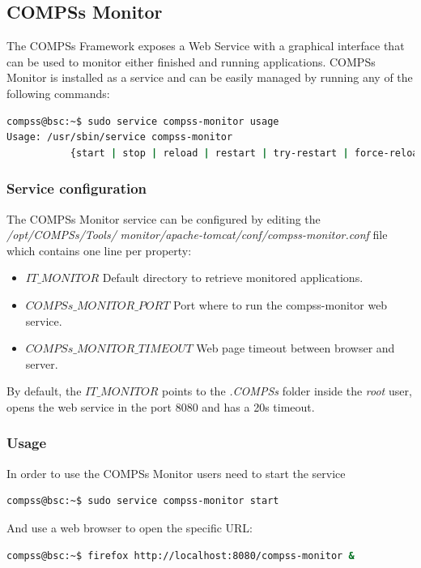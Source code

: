 \subsection{COMPSs Monitor}
\label{subsec:monitor}
The COMPSs Framework exposes a Web Service with a graphical interface that can be used to monitor either finished 
and running applications. COMPSs Monitor is installed as a service and can be easily managed by running any of the following
commands:
\begin{lstlisting}[language=bash]
compss@bsc:~$ sudo service compss-monitor usage
Usage: /usr/sbin/service compss-monitor 
           {start | stop | reload | restart | try-restart | force-reload | status}
\end{lstlisting}

\subsubsection{Service configuration}
The COMPSs Monitor service can be configured by editing the \textit{/opt/COMPSs/Tools/}
\textit{monitor/apache-tomcat/conf/compss-monitor.conf}
file which contains one line per property:
\begin{itemize}
 \item \textbf{$IT\_MONITOR$} Default directory to retrieve monitored applications.
 \item \textbf{$COMPSs\_MONITOR\_PORT$} Port where to run the compss-monitor web service.
 \item \textbf{$COMPSs\_MONITOR\_TIMEOUT$} Web page timeout between browser and server.
\end{itemize}

By default, the $IT\_MONITOR$ points to the \textit{.COMPSs} folder inside the \textit{root} user, opens the web service in the 
port 8080 and has a 20s timeout. 

\subsubsection{Usage}
In order to use the COMPSs Monitor users need to start the service 
\begin{lstlisting}[language=bash]
compss@bsc:~$ sudo service compss-monitor start
\end{lstlisting}
And use a web browser to open the specific URL:
\begin{lstlisting}[language=bash]
compss@bsc:~$ firefox http://localhost:8080/compss-monitor &
\end{lstlisting}

